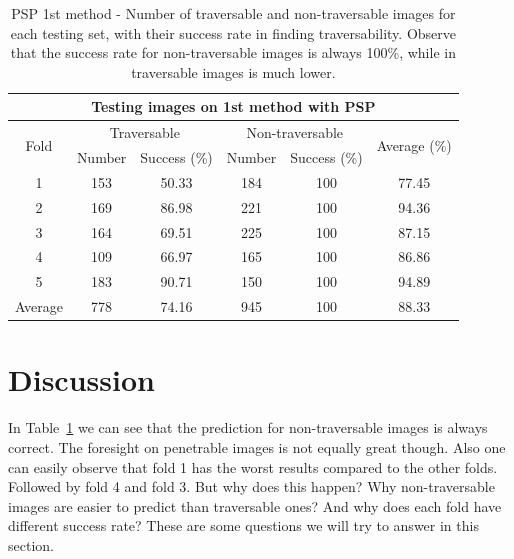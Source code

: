 \documentclass[12pt,a4paper,table,dvipsnames,tikz]{report}
\newcommand{\acronym}{\MakeUppercase}
\newcommand{\bl}[1]{{\hypersetup{linkcolor=blue}#1}}
\begin{document}
	
	\begin{table}[h!]
		\caption{\acronym{psp} 1st method - Number of traversable and non-traversable 
			images for each testing set, with their success rate in finding traversability. 
			Observe that the success rate for non-traversable images is always 100\%, 
			while in traversable images is much lower.}
		\centering
		\begin{tabular}{|c|c|c|c|c||c|}
			\hline
			\multicolumn{6}{|c|}{Testing images on 1st method with \acronym{psp}}\\
			\hline
			\multirow{2}{*}{Fold} & \multicolumn{2}{c}{Traversable} 
			& \multicolumn{2}{|c||}{Non-traversable} & \multirow{2}{*}{Average (\%)}\\
			& Number & Success (\%) & Number & Success (\%) &\\ 
			\hline\hline
			1 & 153 & 50.33 & 184 & 100 & 77.45\\
			\hline
			2 & 169 & 86.98 & 221 & 100 & 94.36\\
			\hline
			3 & 164 & 69.51 & 225 & 100 & 87.15\\
			\hline
			4 & 109 & 66.97 & 165 & 100 & 86.86\\
			\hline
			5 & 183 & 90.71 & 150 & 100 & 94.89\\
			\hline\hline
			Average & 778 & 74.16 & 945 & 100 & 88.33\\
			\hline
		\end{tabular}
		\label{table:psp:1st}
	\end{table}
	
	\section{Discussion}
	\label{sec:exp:dis}
	
	In Table~\bl{\ref{table:psp:1st}} we can see that the prediction for non-traversable 
	images is always correct. The foresight on penetrable images is not equally great though. 
	Also one can easily observe that fold 1 has the worst results compared to the other 
	folds. Followed by fold 4 and fold 3. But why does this happen? Why non-traversable 
	images are easier to predict than traversable ones? And why does each fold have different 
	success rate? These are some questions we will try to answer in this section.
	\\
	
\end{document}
